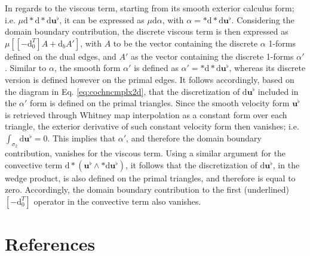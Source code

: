 \documentclass[final,12pt,times]{elsarticle}
\begin{document}
In regards to the viscous term, starting from its smooth exterior calculus form; i.e. $\mu \textrm{d} \ast \textrm{d} \ast \textrm{d} \mathbf{u}^\flat$, it can be expressed as $\mu \textrm{d} \alpha$, with $\alpha =  \ast \textrm{d} \ast \textrm{d}  \mathbf{u}^\flat$. Considering the domain boundary contribution, the discrete viscous term is then expressed as $\mu \left[[-\textrm{d}^T_0] A + \textrm{d}_b A'\right]$, with $A$ to be the vector containing the discrete $\alpha$ 1-forms defined on the dual edges, and $A'$ as the vector containing the discrete 1-forms $\alpha'$. Similar to $\alpha$, the smooth form $\alpha'$ is defined as $\alpha' = \ast \textrm{d} \ast \textrm{d} \mathbf{u}^\flat$, whereas its discrete version is defined however on the primal edges. It follows accordingly, based on the diagram in Eq. \eqref{eq:cochncmplx2d}, that the discretization of $\textrm{d} \mathbf{u}^\flat$ included in the $\alpha'$ form is defined on the primal triangles. Since the smooth velocity form $\mathbf{u}^\flat$ is retrieved through Whitney map interpolation as a constant form over each triangle, the exterior derivative of such constant velocity form then vanishes; i.e. $\int_{\sigma_2} \textrm{d} \mathbf{u}^\flat = 0$. This implies that $\alpha'$, and therefore the domain boundary contribution, vanishes for the viscous term. Using a similar argument for the convective term $\textrm{d} \ast (\mathbf{u}^\flat \wedge \ast \textrm{d} \mathbf{u}^\flat)$, it follows that the discretization of $\textrm{d} \mathbf{u}^\flat$, in the wedge product, is also defined on the primal triangles, and therefore is equal to zero. Accordingly, the domain boundary contribution to the first (underlined) $[-\textrm{d}^T_0]$ operator in the convective term also vanishes.

\section*{References}
 






\end{document}
